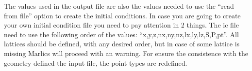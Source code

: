 \documentclass{article}
\begin{document}
The values used in the output file are also the values needed to use the ``read from file'' option to create the initial conditions. In case you are going to create your own initial condition file you need to pay attention in 2 things. The ic file need to use the following order of the values: ``x,y,z,nx,ny,nz,lx,ly,lz,S,P,pt''. All lattices should be defined, with any desired order, but in case of some lattice is missing Marlics will proceed with an warning. For ensure the consistence with the geometry defined the input file, the point types are redefined.
\end{document}
